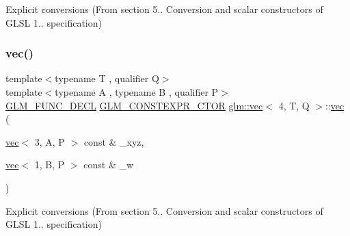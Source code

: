 Explicit conversions (From section 5.. Conversion and scalar constructors of G\+L\+SL 1.. specification) 

\mbox{\label{structglm_1_1vec_3_014_00_01_t_00_01_q_01_4_a978b89aabfd77a4d64bbd7d347e98ffe}} 
\subsubsection{\texorpdfstring{vec()}{vec()}\hspace{0.1cm}{\footnotesize\ttfamily [15/34]}}
{\footnotesize\ttfamily template$<$typename T , qualifier Q$>$ \\
template$<$typename A , typename B , qualifier P$>$ \\
\hyperlink{setup_8hpp_ab2d052de21a70539923e9bcbf6e83a51}{G\+L\+M\+\_\+\+F\+U\+N\+C\+\_\+\+D\+E\+CL} \hyperlink{setup_8hpp_ad34178a09666081abdb573c14d1f4a5a}{G\+L\+M\+\_\+\+C\+O\+N\+S\+T\+E\+X\+P\+R\+\_\+\+C\+T\+OR} \hyperlink{structglm_1_1vec}{glm\+::vec}$<$ 4, T, Q $>$\+::\hyperlink{structglm_1_1vec}{vec} (\begin{DoxyParamCaption}\item[{\hyperlink{structglm_1_1vec}{vec}$<$ 3, A, P $>$ const \&}]{\+\_\+xyz,  }\item[{\hyperlink{structglm_1_1vec}{vec}$<$ 1, B, P $>$ const \&}]{\+\_\+w }\end{DoxyParamCaption})}



Explicit conversions (From section 5.. Conversion and scalar constructors of G\+L\+SL 1.. specification) 

\mbox{\label{structglm_1_1vec_3_014_00_01_t_00_01_q_01_4_a91225fa0646f68aae775792183d3e0df}} 
